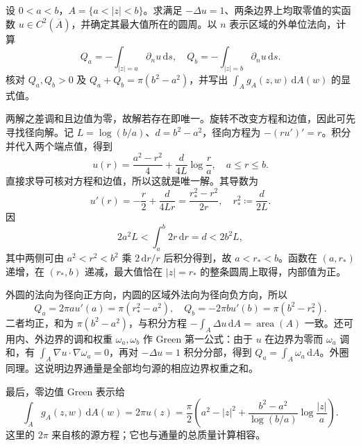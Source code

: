 \begin{exercise}[圆环中的均匀源及边界通量]\label{b3:ex:17-draft-02}
设 \(0<a<b\)，\(A=\{a<|z|<b\}\)。求满足 \(-\Delta u=1\)、两条边界上均取零值的实函数 \(u\in C^2(\overline A)\)，并确定其最大值所在的圆周。以 \(n\) 表示区域的外单位法向，计算
\[
 Q_a=-\int_{|z|=a}\partial_nu\,\mathrm ds,\quad
 Q_b=-\int_{|z|=b}\partial_nu\,\mathrm ds.
\]
核对 \(Q_a,Q_b>0\) 及 \(Q_a+Q_b=\pi(b^2-a^2)\)，并写出 \(\int_Ag_A(z,w)\,\mathrm dA(w)\) 的显式值。
\end{exercise}
\begin{solution}
两解之差调和且边值为零，故解若存在即唯一。旋转不改变方程和边值，因此可先寻找径向解。记 \(L=\log(b/a)\)、\(d=b^2-a^2\)，径向方程为 \(-(ru')'=r\)。积分并代入两个端点值，得到
\[
 u(r)=\frac{a^2-r^2}{4}+\frac d{4L}\log\frac ra,
 \quad a\le r\le b.
\]
直接求导可核对方程和边值，所以这就是唯一解。其导数为
\[
 u'(r)=-\frac r2+\frac d{4Lr}
       =\frac{r_*^2-r^2}{2r},\quad
 r_*^2\coloneqq\frac d{2L}.
\]
因
\[
 2a^2L<\int_a^b2r\,\mathrm dr=d<2b^2L,
\]
其中两侧可由 \(a^2<r^2<b^2\) 乘 \(2\,\mathrm dr/r\) 后积分得到，故 \(a<r_*<b\)。函数在 \((a,r_*)\) 递增，在 \((r_*,b)\) 递减，最大值恰在 \(|z|=r_*\) 的整条圆周上取得，内部值为正。

外圆的法向为径向正方向，内圆的区域外法向为径向负方向，所以
\[
 Q_a=2\pi a u'(a)=\pi(r_*^2-a^2),\quad
 Q_b=-2\pi b u'(b)=\pi(b^2-r_*^2).
\]
二者均正，和为 \(\pi(b^2-a^2)\)，与积分方程 \(-\int_A\Delta u\,\mathrm dA=\operatorname{area}(A)\) 一致。还可用内、外边界的调和权重 \(\omega_a,\omega_b\) 作 Green 第一公式：由于 \(u\) 在边界为零而 \(\omega_a\) 调和，有 \(\int_A\nabla u\cdot\nabla\omega_a=0\)，再对 \(-\Delta u=1\) 积分分部，得到 \(Q_a=\int_A\omega_a\,\mathrm dA\)。外圈同理。这说明边界通量是全部均匀源的相应边界权重之和。

最后，零边值 Green 表示给
\[
 \int_Ag_A(z,w)\,\mathrm dA(w)=2\pi u(z)
 =\frac\pi2\left(a^2-|z|^2+
       \frac{b^2-a^2}{\log(b/a)}\log\frac{|z|}a\right).
\]
这里的 \(2\pi\) 来自核的源方程；它也与通量的总质量计算相容。
\end{solution}

